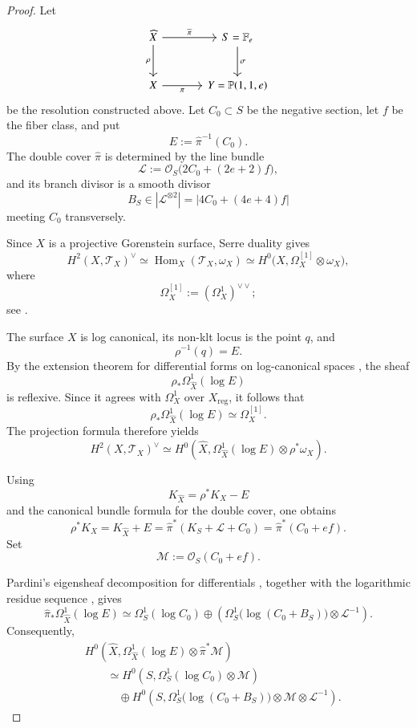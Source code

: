 \documentclass[11pt,twoside]{amsart}
\theoremstyle{plain}
\numberwithin{equation}{section}
\theoremstyle{definition}
\begin{document}
\begin{proof}
Let
\[
\begin{tikzcd}[column sep=large,row sep=large]
    \widehat X
    \arrow[r,"\widehat\pi"]
    \arrow[d,"\rho"']
    &
    S=\mathbb F_e
    \arrow[d,"\sigma"]
    \\
    X
    \arrow[r,"\pi"']
    &
    Y=\mathbb P(1,1,e)
\end{tikzcd}
\]
be the resolution constructed above. Let $C_0\subset S$ be the negative section, let
$f$ be the fiber class, and put
\[
E:=\widehat\pi^{-1}(C_0).
\]
The double cover $\widehat\pi$ is determined by the line bundle
\[
\mathcal L
:=
\mathcal O_S\bigl(2C_0+(2e+2)f\bigr),
\]
and its branch divisor is a smooth divisor
\[
B_S\in\left|\mathcal L^{\otimes 2}\right|
=
\left|4C_0+(4e+4)f\right|
\]
meeting $C_0$ transversely.

Since $X$ is a projective Gorenstein surface, Serre duality gives
\[
H^2(X,\mathcal T_X)^\vee
\simeq
\operatorname{Hom}_X(\mathcal T_X,\omega_X)
\simeq
H^0\bigl(X,\Omega_X^{[1]}\otimes\omega_X\bigr),
\]
where
\[
\Omega_X^{[1]}:=(\Omega_X^1)^{\vee\vee};
\]
see \cite[Chapter~III, Theorem~7.6]{Hartshorne}.

The surface $X$ is log canonical, its non-klt locus is the point $q$, and
\[
\rho^{-1}(q)=E.
\]
By the extension theorem for differential forms on log-canonical spaces
\cite[Theorem~1.5]{GKKP}, the sheaf
\[
\rho_*\Omega_{\widehat X}^1(\log E)
\]
is reflexive. Since it agrees with $\Omega_X^1$ over $X_{\mathrm{reg}}$, it follows that
\[
\rho_*\Omega_{\widehat X}^1(\log E)
\simeq
\Omega_X^{[1]}.
\]
The projection formula therefore yields
\[
H^2(X,\mathcal T_X)^\vee
\simeq
H^0\left(
\widehat X,
\Omega_{\widehat X}^1(\log E)\otimes\rho^*\omega_X
\right).
\]

Using
\[
K_{\widehat X}=\rho^*K_X-E
\]
and the canonical bundle formula for the double cover, one obtains
\[
\rho^*K_X
=
K_{\widehat X}+E
=
\widehat\pi^*(K_S+\mathcal L+C_0)
=
\widehat\pi^*(C_0+ef).
\]
Set
\[
\mathcal M:=\mathcal O_S(C_0+ef).
\]

Pardini's eigensheaf decomposition for differentials
\cite[Proposition~4.1(b)]{Par91}, together with the logarithmic residue sequence
\cite[(2.3)]{EV}, gives
\[
\widehat\pi_*\Omega_{\widehat X}^1(\log E)
\simeq
\Omega_S^1(\log C_0)
\oplus
\left(
\Omega_S^1\bigl(\log(C_0+B_S)\bigr)
\otimes\mathcal L^{-1}
\right).
\]
Consequently,
\begin{align*}
&H^0\left(
\widehat X,
\Omega_{\widehat X}^1(\log E)\otimes\widehat\pi^*\mathcal M
\right)
\\
&\qquad\simeq
H^0\left(
S,\Omega_S^1(\log C_0)\otimes\mathcal M
\right)
\\
&\qquad\quad\oplus
H^0\left(
S,
\Omega_S^1\bigl(\log(C_0+B_S)\bigr)
\otimes\mathcal M\otimes\mathcal L^{-1}
\right).
\end{align*}


\end{proof}
\end{document}
